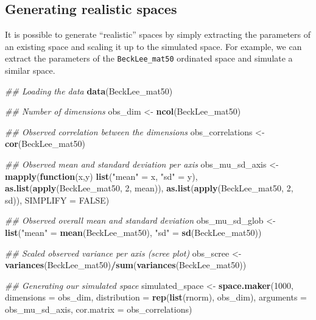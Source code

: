 \documentclass[]{book}
\newenvironment{Shaded}{\begin{snugshade}}{\end{snugshade}}
\newcommand{\CommentTok}[1]{\textcolor[rgb]{0.56,0.35,0.01}{\textit{#1}}}
\newcommand{\ControlFlowTok}[1]{\textcolor[rgb]{0.13,0.29,0.53}{\textbf{#1}}}
\newcommand{\DataTypeTok}[1]{\textcolor[rgb]{0.13,0.29,0.53}{#1}}
\newcommand{\DecValTok}[1]{\textcolor[rgb]{0.00,0.00,0.81}{#1}}
\newcommand{\KeywordTok}[1]{\textcolor[rgb]{0.13,0.29,0.53}{\textbf{#1}}}
\newcommand{\NormalTok}[1]{#1}
\newcommand{\OperatorTok}[1]{\textcolor[rgb]{0.81,0.36,0.00}{\textbf{#1}}}
\newcommand{\OtherTok}[1]{\textcolor[rgb]{0.56,0.35,0.01}{#1}}
\newcommand{\StringTok}[1]{\textcolor[rgb]{0.31,0.60,0.02}{#1}}
\begin{document}
\hypertarget{generating-realistic-spaces}{%
\subsection{Generating realistic spaces}\label{generating-realistic-spaces}}

It is possible to generate ``realistic'' spaces by simply extracting the parameters of an existing space and scaling it up to the simulated space.
For example, we can extract the parameters of the \texttt{BeckLee\_mat50} ordinated space and simulate a similar space.

\begin{Shaded}
\begin{Highlighting}[]
\CommentTok{## Loading the data}
\KeywordTok{data}\NormalTok{(BeckLee_mat50)}

\CommentTok{## Number of dimensions}
\NormalTok{obs_dim <-}\StringTok{ }\KeywordTok{ncol}\NormalTok{(BeckLee_mat50)}

\CommentTok{## Observed correlation between the dimensions}
\NormalTok{obs_correlations <-}\StringTok{ }\KeywordTok{cor}\NormalTok{(BeckLee_mat50)}

\CommentTok{## Observed mean and standard deviation per axis}
\NormalTok{obs_mu_sd_axis <-}\StringTok{ }\KeywordTok{mapply}\NormalTok{(}\ControlFlowTok{function}\NormalTok{(x,y) }\KeywordTok{list}\NormalTok{(}\StringTok{"mean"}\NormalTok{ =}\StringTok{ }\NormalTok{x, }\StringTok{"sd"}\NormalTok{ =}\StringTok{ }\NormalTok{y),}
                         \KeywordTok{as.list}\NormalTok{(}\KeywordTok{apply}\NormalTok{(BeckLee_mat50, }\DecValTok{2}\NormalTok{, mean)),}
                         \KeywordTok{as.list}\NormalTok{(}\KeywordTok{apply}\NormalTok{(BeckLee_mat50, }\DecValTok{2}\NormalTok{, sd)), }\DataTypeTok{SIMPLIFY =} \OtherTok{FALSE}\NormalTok{)}

\CommentTok{## Observed overall mean and standard deviation}
\NormalTok{obs_mu_sd_glob <-}\StringTok{ }\KeywordTok{list}\NormalTok{(}\StringTok{"mean"}\NormalTok{ =}\StringTok{ }\KeywordTok{mean}\NormalTok{(BeckLee_mat50), }\StringTok{"sd"}\NormalTok{ =}\StringTok{ }\KeywordTok{sd}\NormalTok{(BeckLee_mat50))}

\CommentTok{## Scaled observed variance per axis (scree plot)}
\NormalTok{obs_scree <-}\StringTok{ }\KeywordTok{variances}\NormalTok{(BeckLee_mat50)}\OperatorTok{/}\KeywordTok{sum}\NormalTok{(}\KeywordTok{variances}\NormalTok{(BeckLee_mat50))}

\CommentTok{## Generating our simulated space}
\NormalTok{simulated_space <-}\StringTok{ }\KeywordTok{space.maker}\NormalTok{(}\DecValTok{1000}\NormalTok{, }\DataTypeTok{dimensions =}\NormalTok{ obs_dim, }
                               \DataTypeTok{distribution =} \KeywordTok{rep}\NormalTok{(}\KeywordTok{list}\NormalTok{(rnorm), obs_dim),}
                               \DataTypeTok{arguments =}\NormalTok{ obs_mu_sd_axis,}
                               \DataTypeTok{cor.matrix =}\NormalTok{ obs_correlations)}


\end{Highlighting}
\end{Shaded}
\end{document}
